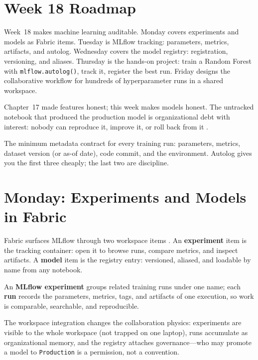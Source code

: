 \section{Week 18 Roadmap}
Week~18 makes machine learning auditable. Monday covers experiments and models as Fabric items. Tuesday is MLflow tracking: parameters, metrics, artifacts, and autolog. Wednesday covers the model registry: registration, versioning, and aliases. Thursday is the hands-on project: train a Random Forest with \texttt{mlflow.autolog()}, track it, register the best run. Friday designs the collaborative workflow for hundreds of hyperparameter runs in a shared workspace.

Chapter~17 made features honest; this week makes models honest. The untracked notebook that produced the production model is organizational debt with interest: nobody can reproduce it, improve it, or roll back from it \cite{microsoftMlflowFabric,mlflowDocs}.

\begin{notebox}
The minimum metadata contract for every training run: parameters, metrics, dataset version (or as-of date), code commit, and the environment. Autolog gives you the first three cheaply; the last two are discipline.
\end{notebox}

\section{Monday: Experiments and Models in Fabric}
Fabric surfaces MLflow through two workspace items \cite{microsoftMlflowFabric}. An \textbf{experiment} item is the tracking container: open it to browse runs, compare metrics, and inspect artifacts. A \textbf{model} item is the registry entry: versioned, aliased, and loadable by name from any notebook.

\begin{definitionbox}
An \textbf{MLflow experiment} groups related training runs under one name; each \textbf{run} records the parameters, metrics, tags, and artifacts of one execution, so work is comparable, searchable, and reproducible.
\end{definitionbox}

The workspace integration changes the collaboration physics: experiments are visible to the whole workspace (not trapped on one laptop), runs accumulate as organizational memory, and the registry attaches governance---who may promote a model to \texttt{Production} is a permission, not a convention.

